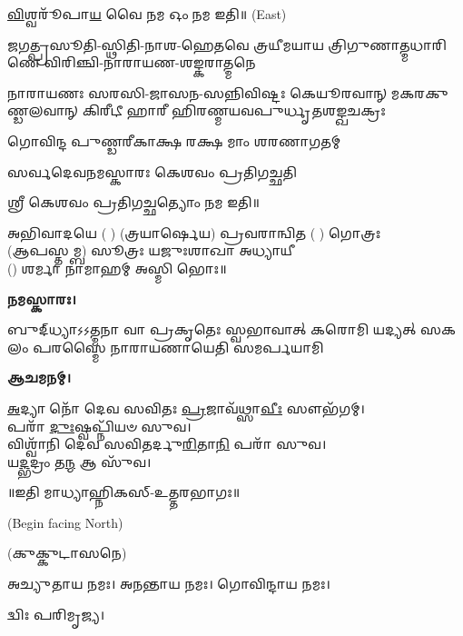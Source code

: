 \-\ul{𑌵𑌿}\-𑌶𑍍𑌵𑌰𑍂᳴𑌪𑌾\-\ul{𑌯} 𑌵𑍈 𑌨𑌮 𑌓𑌂 𑌨𑌮 𑌇𑌤𑌿॥
{\scriptsize (East)}

{𑌜𑌗𑌤𑍍𑌪𑍍𑌰𑌸𑍂𑌤𑌿-𑌸𑍍𑌥𑌿𑌤𑌿-𑌨𑌾𑌶-𑌹𑍇𑌤𑌵𑍇}
{𑌤𑍍𑌰𑌯𑍀𑌮𑌯𑌾𑌯 𑌤𑍍𑌰𑌿𑌗𑍁𑌣𑌾𑌤𑍍𑌮𑌧𑌾𑌰𑌿𑌣𑍇}
{𑌵𑌿𑌰𑌿𑌞𑍍𑌚𑌿-𑌨𑌾𑌰𑌾𑌯𑌣-𑌶𑌙𑍍𑌕𑌰𑌾𑌤𑍍𑌮𑌨𑍇}

{𑌨𑌾𑌰𑌾𑌯𑌣𑌃 𑌸𑌰𑌸𑌿-𑌜𑌾𑌸𑌨-𑌸𑌨𑍍𑌨𑌿𑌵𑌿𑌷𑍍𑌟𑌃}
{𑌕𑍇𑌯𑍂𑌰𑌵𑌾𑌨𑍍 𑌮𑌕𑌰𑌕𑍁𑌣𑍍𑌡𑌲𑌵𑌾𑌨𑍍 𑌕𑌿𑌰𑍀𑌟𑍀}
{𑌹𑌾𑌰𑍀 𑌹𑌿𑌰𑌣𑍍𑌮𑌯𑌵𑌪𑍁𑌰𑍍𑌧𑍃𑌤𑌶𑌙𑍍𑌖𑌚𑌕𑍍𑌰𑌃}

{𑌗𑍋𑌵𑌿𑌨𑍍𑌦 𑌪𑍁𑌣𑍍𑌡𑌰𑍀𑌕𑌾𑌕𑍍𑌷 𑌰𑌕𑍍𑌷 𑌮𑌾𑌂 𑌶𑌰𑌣𑌾𑌗𑌤𑌮𑍍}

{𑌸𑌰𑍍𑌵𑌦𑍇𑌵𑌨𑌮𑌸𑍍𑌕𑌾𑌰𑌃 𑌕𑍇𑌶𑌵𑌂 𑌪𑍍𑌰𑌤𑌿𑌗𑌚𑍍𑌛𑌤𑌿}

𑌶𑍍𑌰𑍀 𑌕𑍇𑌶𑌵𑌂 𑌪𑍍𑌰𑌤𑌿𑌗𑌚𑍍𑌛𑌤𑍍𑌯𑍋𑌂 𑌨𑌮 𑌇𑌤𑌿॥

𑌅𑌭𑌿𑌵𑌾𑌦𑌯𑍇 ( ) (𑌤𑍍𑌰𑌯𑌾𑌰𑍍𑌷𑍇𑌯) 𑌪𑍍𑌰𑌵𑌰𑌾𑌨𑍍𑌵𑌿𑌤 ( ) 𑌗𑍋𑌤𑍍𑌰𑌃\\
(𑌆𑌪𑌸𑍍𑌤𑌮𑍍𑌬) 𑌸𑍂𑌤𑍍𑌰𑌃 𑌯𑌜𑍁𑌃𑌶𑌾𑌖𑌾 𑌅𑌧𑍍𑌯𑌾𑌯𑍀\\
() 𑌶𑌰𑍍𑌮𑌾 𑌨𑌾𑌮𑌾𑌹𑌮𑍍 𑌅𑌸𑍍𑌮𑌿 𑌭𑍋𑌃॥

\textbf{𑌨𑌮𑌸𑍍𑌕𑌾𑌰𑌃।}

{𑌬𑍁𑌦𑍍‌𑌧𑍍𑌯𑌾𑌽𑌽𑌤𑍍𑌮𑌨𑌾 𑌵𑌾 𑌪𑍍𑌰𑌕𑍃𑌤𑍇𑌃 𑌸𑍍𑌵𑌭𑌾𑌵𑌾𑌤𑍍}
{𑌕𑌰𑍋𑌮𑌿 𑌯𑌦𑍍𑌯𑌤𑍍 𑌸𑌕𑌲𑌂 𑌪𑌰𑌸𑍍𑌮𑍈}
{𑌨𑌾𑌰𑌾𑌯𑌣𑌾𑌯𑍇𑌤𑌿 𑌸𑌮𑌰𑍍𑌪𑌯𑌾𑌮𑌿}

\textbf{𑌆𑌚𑌮𑌨𑌮𑍍।}


\-\ul{𑌅}\-𑌦𑍍𑌯𑌾 𑌨𑍋᳴ 𑌦𑍇𑌵 𑌸𑌵𑌿𑌤𑌃 \ul{𑌪𑍍𑌰}\-𑌜𑌾𑌵᳴𑌥𑍍𑌸𑌾\-\ul{𑌵𑍀𑌃} 𑌸𑍗𑌭᳴𑌗𑌮𑍍।\\
𑌪𑌰𑌾᳴ \ul{𑌦𑍁𑌃}\-𑌷𑍍𑌵𑌪𑍍𑌨𑌿᳴𑌯𑍞 𑌸𑍁𑌵।\\
𑌵𑌿𑌶𑍍𑌵𑌾᳴𑌨𑌿 𑌦𑍇𑌵 𑌸𑌵𑌿𑌤𑌰𑍍𑌦𑍁\-\ul{𑌰𑌿}\-𑌤𑌾\-\ul{𑌨𑌿} 𑌪𑌰𑌾᳴ 𑌸𑍁𑌵।\\
𑌯\-\ul{𑌦𑍍𑌭}\-𑌦𑍍𑌰𑌂 𑌤\-\ul{𑌨𑍍𑌮} 𑌆 𑌸𑍁᳴𑌵।

\centerline{॥𑌇𑌤𑌿 𑌮𑌾𑌧𑍍𑌯𑌾𑌹𑍍𑌨𑌿𑌕𑌸𑍍-𑌉𑌤𑍍𑌤𑌰𑌭𑌾𑌗𑌃॥}


\renewcommand{\sectionmark}[1]{%
\markboth{\large #1 (𑌸𑌾𑌯𑌂 𑌸𑌨𑍍𑌧𑍍𑌯𑌾)}{}}

{\scriptsize (Begin facing North)}


(𑌕𑍁𑌕𑍍𑌕𑍁𑌟𑌾𑌸𑌨𑍇)

𑌅𑌚𑍍𑌯𑍁𑌤𑌾𑌯 𑌨𑌮𑌃। 𑌅𑌨𑌨𑍍𑌤𑌾𑌯 𑌨𑌮𑌃। 𑌗𑍋𑌵𑌿𑌨𑍍𑌦𑌾𑌯 𑌨𑌮𑌃। 

𑌦𑍍𑌵𑌿𑌃 𑌪𑌰𑌿𑌮𑍃𑌜𑍍𑌯।


